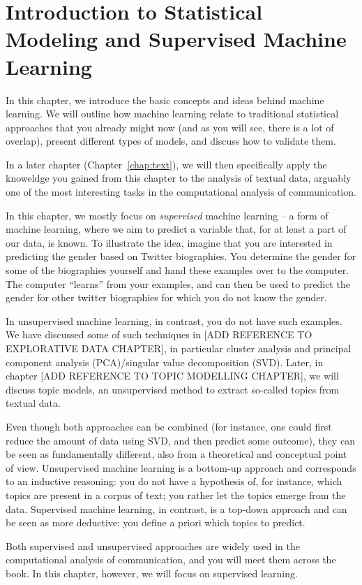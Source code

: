 \chapter{Introduction to Statistical Modeling and Supervised Machine Learning}
\label{chap:introsml}
In this chapter, we introduce the basic concepts and ideas behind
machine learning.  We will outline how machine learning relate to
traditional statistical approaches that you already might now (and as
you will see, there is a lot of overlap), present different types of
models, and discuss how to validate them.

In a later chapter (Chapter~\ref{chap:text}), we will then
specifically apply the knoweldge you gained from this chapter to the
analysis of textual data, arguably one of the most interesting tasks
in the computational analysis of communication.

In this chapter, we mostly focus on \emph{supervised} machine learning
-- a form of machine learning, where we aim to predict a variable
that, for at least a part of our data, is known. To illustrate the
idea, imagine that you are interested in predicting the gender based
on Twitter biographies. You determine the gender for some of the
biographies yourself and hand these examples over to the computer. The
computer ``learns'' from your examples, and can then be used to
predict the gender for other twitter biographies for which you do not
know the gender.

In unsupervised machine learning, in contrast, you do not have such
examples. We have discussed some of such techniques in [ADD REFERENCE
  TO EXPLORATIVE DATA CHAPTER], in particular cluster analysis and
principal component analysis (PCA)/singular value decomposition (SVD).
Later, in chapter [ADD REFERENCE TO TOPIC MODELLING CHAPTER], we will
discuss topic models, an unsupervised method to extract so-called
topics from textual data.

Even though both approaches can be combined (for instance, one could
first reduce the amount of data using SVD, and then predict some
outcome), they can be seen as fundamentally different, also from a
theoretical and conceptual point of view.  Unsupervised machine
learning is a bottom-up approach and corresponds to an inductive
reasoning: you do not have a hypothesis of, for instance, which topics
are present in a corpus of text; you rather let the topics emerge from
the data.  Supervised machine learning, in contrast, is a top-down
approach and can be seen as more deductive: you define a priori which
topics to predict.

Both supervised and unsupervised approaches are widely used in the computational analysis of communication, and you will meet them across the book.
In this chapter, however, we will focus on supervised learning.








